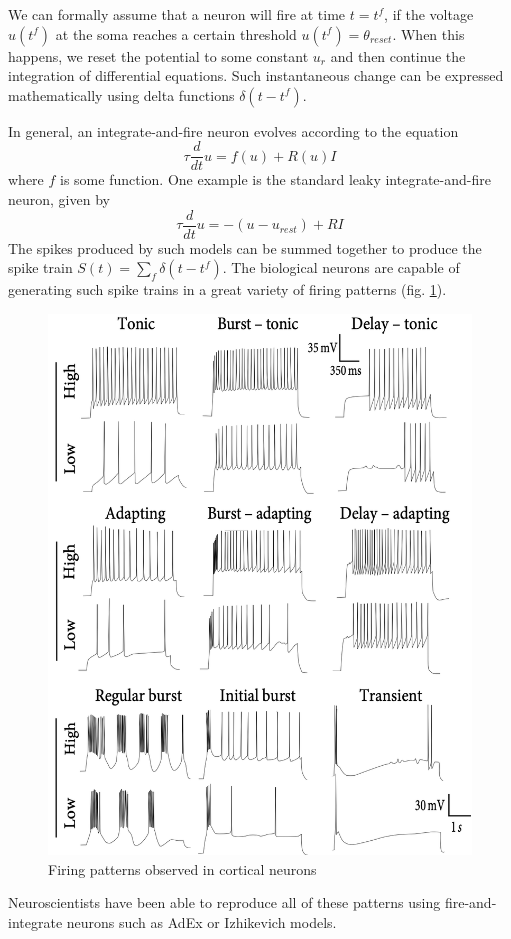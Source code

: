 \documentclass[12pt]{article}
\begin{document}
We can formally assume that a neuron will fire at time $t=t^f$, if the voltage $u(t^f)$ at the soma reaches a certain threshold $u(t^f)=\theta_{reset}$. When this happens, we reset the potential to some constant $u_r$ and then continue the integration of differential equations. Such instantaneous change can be expressed mathematically using delta functions $\delta(t-t^f)$. 

In general, an integrate-and-fire neuron evolves according to the equation
\[
\tau \frac{d}{dt}u = f(u) + R(u)I
\]
where $f$ is some function. One example is the standard leaky integrate-and-fire neuron, given by
\[
\tau \frac{d}{dt}u = -(u-u_{rest}) + R I
\]
The spikes produced by such models can be summed together to produce the spike train $S(t)=\sum_f \delta(t-t^f)$. The biological neurons are capable of generating such spike trains in a great variety of firing patterns (fig. \ref{fig:cortial_spike_patterns}).
\begin{figure}[!htbp]
	\centering
	\includegraphics[width=13cm]{cortial_spike_patterns}
	\caption{Firing patterns observed in cortical neurons}
	\label{fig:cortial_spike_patterns}
\end{figure}
Neuroscientists have been able to reproduce all of these patterns using fire-and-integrate neurons such as AdEx or Izhikevich models.
\end{document}
